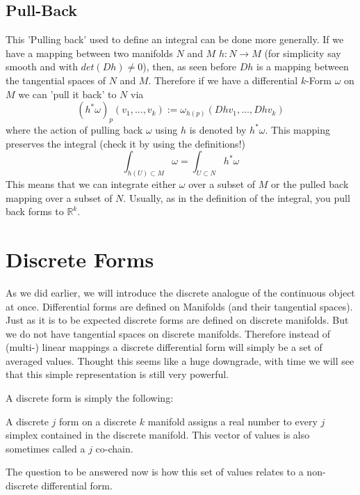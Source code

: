 
\subsection{Pull-Back}
This 'Pulling back' used to define an integral can be done more generally. If we have a mapping between two manifolds $N$ and $M$ $h: N\to M$ (for simplicity say smooth and with $det(Dh) \neq 0$), then, as seen before $Dh$ is a mapping between the tangential spaces of $N$ and $M$. Therefore if we have a differential $k$-Form $\omega$ on $M$ we can 'pull it back' to $N$ via
\[(h^*\omega)_p (v_1,...,v_k) := \omega_{h(p)}(Dh v_1,...,Dh v_k) \]
 where the action of pulling back $\omega$ using $h$ is denoted by $h^* \omega$. This mapping preserves the integral (check it by using the definitions!)
\[\int_{h(U)\subset M} \omega = \int_{U \subset N} h^*\omega \]
This means that we can integrate either $\omega$ over a subset of $M$ or the pulled back mapping over a subset of $N$. Usually, as in the definition of the integral, you pull back forms to $\mathbb R^k$.


\section{Discrete Forms}
As we did earlier, we will introduce the discrete analogue of the continuous object at once. Differential forms are defined on Manifolds (and their tangential spaces). Just as it is to be expected discrete forms are defined on discrete manifolds. But we do not have tangential spaces on discrete manifolds. Therefore instead of (multi-) linear mappings a discrete differential form will simply be a set of averaged values. Thought this seems like a huge downgrade, with time we will see that this simple representation is still very powerful.

A discrete form is simply the following:
\begin{definition}
A discrete $j$ form on a discrete $k$ manifold assigns a real number to every $j$ simplex contained in the discrete manifold.  This vector of values is also sometimes called a $j$ co-chain. 
\end{definition}
The question to be answered now is how this set of values relates to a non-discrete differential form.

